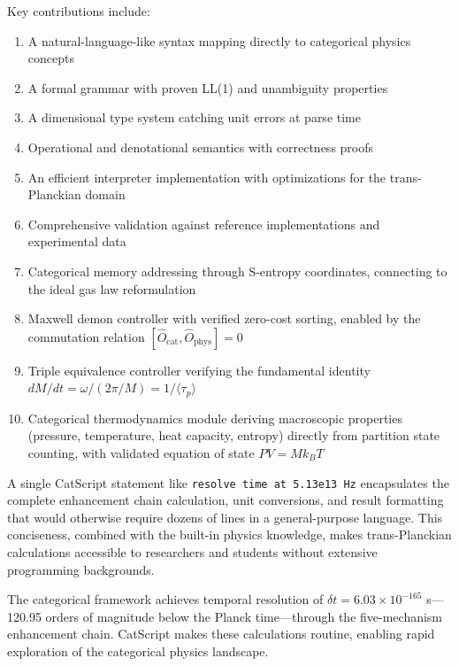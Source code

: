 \documentclass[twocolumn,10pt]{article}
\begin{document}
Key contributions include:

\begin{enumerate}
    \item A natural-language-like syntax mapping directly to categorical physics concepts

    \item A formal grammar with proven LL(1) and unambiguity properties

    \item A dimensional type system catching unit errors at parse time

    \item Operational and denotational semantics with correctness proofs

    \item An efficient interpreter implementation with optimizations for the trans-Planckian domain

    \item Comprehensive validation against reference implementations and experimental data

    \item Categorical memory addressing through S-entropy coordinates, connecting to the ideal gas law reformulation

    \item Maxwell demon controller with verified zero-cost sorting, enabled by the commutation relation $[\hat{O}_{\text{cat}}, \hat{O}_{\text{phys}}] = 0$

    \item Triple equivalence controller verifying the fundamental identity $dM/dt = \omega/(2\pi/M) = 1/\langle\tau_p\rangle$

    \item Categorical thermodynamics module deriving macroscopic properties (pressure, temperature, heat capacity, entropy) directly from partition state counting, with validated equation of state $PV = Mk_BT$
\end{enumerate}

A single CatScript statement like \texttt{resolve time at 5.13e13 Hz} encapsulates the complete enhancement chain calculation, unit conversions, and result formatting that would otherwise require dozens of lines in a general-purpose language. This conciseness, combined with the built-in physics knowledge, makes trans-Planckian calculations accessible to researchers and students without extensive programming backgrounds.

The categorical framework achieves temporal resolution of $\delta t = 6.03 \times 10^{-165}$ s---120.95 orders of magnitude below the Planck time---through the five-mechanism enhancement chain. CatScript makes these calculations routine, enabling rapid exploration of the categorical physics landscape.
\end{document}
